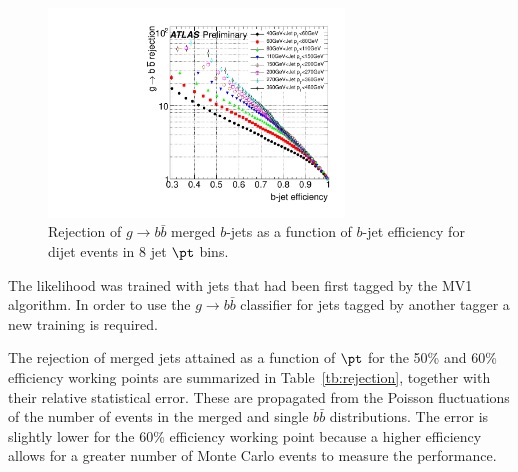 \begin{figure}[tp]
\centering
\includegraphics[width=0.7\textwidth]{FIGS/Likelihood/KDE_RejvsEff.pdf}
\caption{Rejection of $g\rightarrow b \bar{b}$ merged $b$-jets as a function of $b$-jet efficiency for dijet events in 8 jet $\pt$ bins.}
\label{fig:performanceinbins}
\end{figure}

The likelihood was trained with jets that had been first tagged by the MV1 algorithm. In order to use the  $g\rightarrow b \bar{b}$ classifier for jets tagged by another tagger a new training is required.

The rejection of merged jets attained as a function of $\pt$ for the 50\% and 60\% efficiency working points are summarized in Table~\ref{tb:rejection}, together with their relative statistical error. These are propagated from the Poisson fluctuations of the number of events in the merged and single $b\bar{b}$ distributions. The error is slightly lower for the 60\% efficiency working point because a higher efficiency allows for a greater number of Monte Carlo events to measure the performance. %



